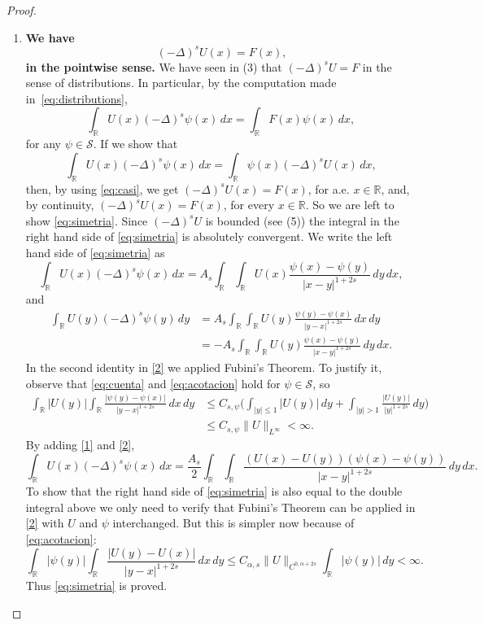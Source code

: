 \documentclass[a4paper,11pt,reqno]{amsart}
\newcommand{\R}{\mathbb{R}}
\theoremstyle{definition}
\numberwithin{equation}{section}
\begin{document}
\begin{proof}
\begin{enumerate}[$(1)$]
\item \textbf{We have}
$$
(-\Delta)^sU(x)=F(x)\textbf{,}
$$
\textbf{in the pointwise sense.}
We have seen in (3) that $(-\Delta)^sU=F$ in the sense of distributions. In particular,
by the computation made in~\eqref{eq:distributions},
\begin{equation}
\label{eq:casi}
\int_{\R}U(x)(-\Delta)^s\psi(x)\,dx=\int_{\R}F(x)\psi(x)\,dx,
\end{equation}
for any $\psi\in\mathcal{S}$. If we show that
\begin{equation}
\label{eq:simetria}
\int_{\R}U(x)(-\Delta)^s\psi(x)\,dx=\int_{\R}\psi(x)(-\Delta)^sU(x)\,dx,
\end{equation}
then, by using \eqref{eq:casi}, we get
$(-\Delta)^sU(x)=F(x)$, for a.e. $x\in\R$, and, by continuity, $(-\Delta)^sU(x)=F(x)$, for every $x\in\R$.
So we are left to show \eqref{eq:simetria}.
Since $(-\Delta)^sU$ is bounded (see (5)) the integral in the right hand side of \eqref{eq:simetria}
is absolutely convergent. We write the left hand side of \eqref{eq:simetria} as
\begin{equation}
\label{1}
\int_{\R}U(x)(-\Delta)^s\psi(x)\,dx=A_s\int_{\R}\int_{\R}U(x)\frac{\psi(x)-\psi(y)}{|x-y|^{1+2s}}\,dy\,dx,
\end{equation}
and
\begin{equation}
\label{2}
\begin{aligned}
\int_{\R}U(y)(-\Delta)^s\psi(y)\,dy 
&=A_s\int_{\R}\int_{\R}U(y)\frac{\psi(y)-\psi(x)}{|y-x|^{1+2s}}\,dx\,dy \\
&=-A_s\int_{\R}\int_{\R}U(y)\frac{\psi(x)-\psi(y)}{|x-y|^{1+2s}}\,dy\,dx.
\end{aligned}
\end{equation}
In the second identity in \eqref{2} we applied Fubini's Theorem.
To justify it, observe that \eqref{eq:cuenta} and \eqref{eq:acotacion} hold for $\psi\in\mathcal{S}$, so
\begin{align*}
\int_{\R}|U(y)|\int_{\R}\frac{|\psi(y)-\psi(x)|}{|y-x|^{1+2s}}\,dx\,dy &\leq
C_{s,\psi}\bigg(\int_{|y|\leq1}|U(y)|\,dy+\int_{|y|>1}\frac{|U(y)|}{|y|^{1+2s}}\,dy\bigg) \\
&\leq C_{s,\psi}\|U\|_{L^\infty}<\infty.
\end{align*}
By adding \eqref{1} and \eqref{2},
$$
\int_{\R}U(x)(-\Delta)^s\psi(x)\,dx 
= \frac{A_s}{2}\int_{\R}\int_{\R}\frac{(U(x)-U(y))(\psi(x)-\psi(y))}{|x-y|^{1+2s}}
\,dy\,dx.
$$
To show that the right hand side of \eqref{eq:simetria} is also equal to the double integral above
we only need to verify that Fubini's Theorem can be applied in \eqref{2} with $U$ and $\psi$ interchanged.
But this is simpler now because of \eqref{eq:acotacion}:
$$
\int_{\R}|\psi(y)|\int_{\R}\frac{|U(y)-U(x)|}{|y-x|^{1+2s}}\,dx\,dy\leq
C_{\alpha,s}\|U\|_{C^{0,\alpha+2s}}\int_{\R}|\psi(y)|\,dy<\infty.
$$
Thus \eqref{eq:simetria} is proved.


\end{enumerate}
\end{proof}
\end{document}
